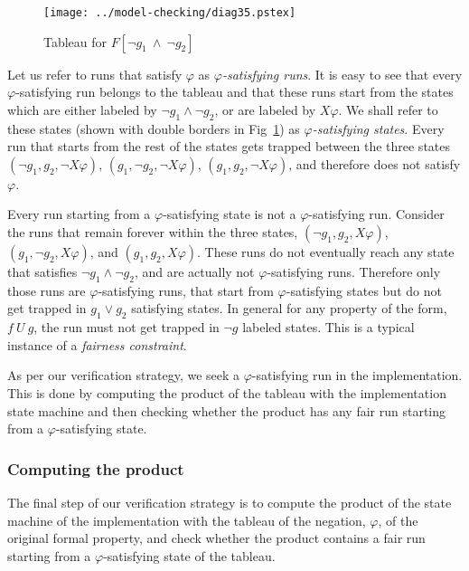 \begin{figure}[htb]
\centering
\texttt{[image: ../model-checking/diag35.pstex]}
\center
\caption{Tableau for $F[ \neg g_1\ \land\ \neg g_2 ]$}
\label{fig2.5a}
\end{figure}
\noindent
Let us refer to runs that satisfy $\varphi$ as {\em $\varphi$-satisfying runs}.
It is easy to see that every $\varphi$-satisfying run belongs to the tableau
and that these runs start from the states which are either labeled by
$\neg g_1 \land \neg g_2$, or are labeled by $X\varphi$. We shall refer to
these states (shown with double borders in Fig~\ref{fig2.5a}) as
{\em $\varphi$-satisfying states}. Every run that starts from the rest of the
states gets trapped between the three states $(\neg g_1, g_2, \neg X\varphi)$,
$(g_1, \neg g_2, \neg X\varphi)$, $(g_1, g_2, \neg X\varphi)$, and therefore
does not satisfy $\varphi$.

\noindent
Every run starting from a $\varphi$-satisfying state is not
a $\varphi$-satisfying run. Consider the runs that remain
forever within the three states, $(\neg g_1, g_2, X\varphi)$,
$(g_1, \neg g_2, X\varphi)$, and $(g_1, g_2, X\varphi)$. These runs do not 
eventually reach any state that satisfies $\neg g_1 \land \neg g_2$, and are
actually not $\varphi$-satisfying runs. Therefore only those runs are
$\varphi$-satisfying runs, that start from $\varphi$-satisfying states but
do not get trapped in $g_1 \lor g_2$ satisfying states. In general for any
property of the form, $f\ U\ g$, the run must not get trapped in
$\neg g$ labeled states. This is a typical instance of a {\em fairness
constraint}.

\noindent
As per our verification strategy, we seek a $\varphi$-satisfying run in the
implementation. This is done by computing the product of the tableau
with the implementation state machine and then checking whether
the product has any fair run starting from a $\varphi$-satisfying state.

\subsubsection{Computing the product}
The final step of our verification strategy is to compute the product of the 
state machine of the implementation with the tableau of the negation,
$\varphi$, of the original formal property, and check whether the product
contains a fair run starting from a $\varphi$-satisfying state of the
tableau.


